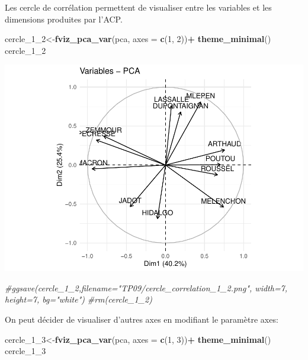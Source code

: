\documentclass[
]{book}
\newenvironment{Shaded}{\begin{snugshade}}{\end{snugshade}}
\newcommand{\AttributeTok}[1]{\textcolor[rgb]{0.13,0.29,0.53}{#1}}
\newcommand{\CommentTok}[1]{\textcolor[rgb]{0.56,0.35,0.01}{\textit{#1}}}
\newcommand{\DecValTok}[1]{\textcolor[rgb]{0.00,0.00,0.81}{#1}}
\newcommand{\FunctionTok}[1]{\textcolor[rgb]{0.13,0.29,0.53}{\textbf{#1}}}
\newcommand{\NormalTok}[1]{#1}
\newcommand{\OtherTok}[1]{\textcolor[rgb]{0.56,0.35,0.01}{#1}}
\newcommand{\SpecialCharTok}[1]{\textcolor[rgb]{0.81,0.36,0.00}{\textbf{#1}}}
\begin{document}
Les cercle de corrélation permettent de visualiser entre les variables et les dimensions produites par l'ACP.

\begin{Shaded}
\begin{Highlighting}[]
\NormalTok{cercle\_1\_2}\OtherTok{\textless{}{-}}\FunctionTok{fviz\_pca\_var}\NormalTok{(pca,  }\AttributeTok{axes =} \FunctionTok{c}\NormalTok{(}\DecValTok{1}\NormalTok{, }\DecValTok{2}\NormalTok{))}\SpecialCharTok{+}
  \FunctionTok{theme\_minimal}\NormalTok{()}
\NormalTok{cercle\_1\_2}
\end{Highlighting}
\end{Shaded}

\includegraphics{bookdown-demo_files/figure-latex/unnamed-chunk-62-1.pdf}

\begin{Shaded}
\begin{Highlighting}[]
\CommentTok{\#ggsave(cercle\_1\_2,filename="TP09/cercle\_correlation\_1\_2.png", width=7, height=7, bg="white")}
\CommentTok{\#rm(cercle\_1\_2)}
\end{Highlighting}
\end{Shaded}

On peut décider de visualiser d'autres axes en modifiant le paramètre axes:

\begin{Shaded}
\begin{Highlighting}[]
\NormalTok{cercle\_1\_3}\OtherTok{\textless{}{-}}\FunctionTok{fviz\_pca\_var}\NormalTok{(pca,  }\AttributeTok{axes =} \FunctionTok{c}\NormalTok{(}\DecValTok{1}\NormalTok{, }\DecValTok{3}\NormalTok{))}\SpecialCharTok{+}
  \FunctionTok{theme\_minimal}\NormalTok{()}
\NormalTok{cercle\_1\_3}
\end{Highlighting}
\end{Shaded}
\end{document}
